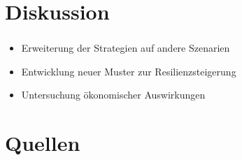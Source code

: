 %
%

\section{Diskussion}

\begin{frame}
    \frametitle{\insertsection}
    \framesubtitle{\insertsubsection}

    \begin{itemize}
        \item Erweiterung der Strategien auf andere Szenarien
        \item Entwicklung neuer Muster zur Resilienzsteigerung
        \item Untersuchung ökonomischer Auswirkungen
    \end{itemize}
\end{frame}

\section{Quellen}
\begin{frame}[allowframebreaks]{\insertsection} %

\end{frame}

